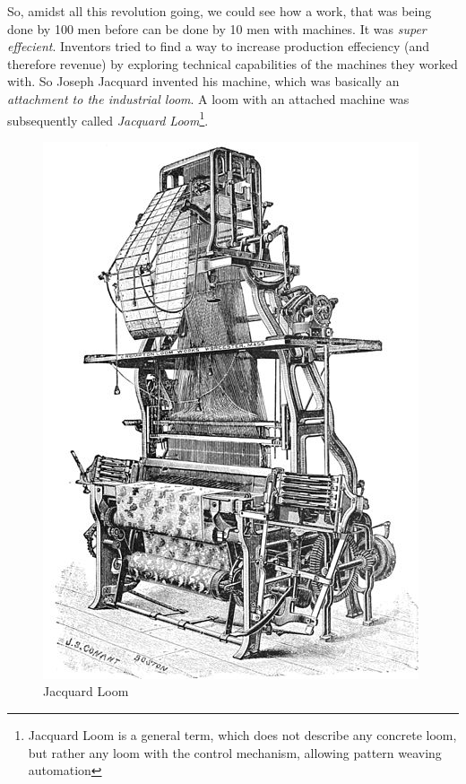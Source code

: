 \documentclass{article}
\begin{document}
            So, amidst all this revolution going, we could see how a work, that was being done by 100 men before can be done by 10 men with machines. It was \emph{super effecient}.
            Inventors tried to find a way to increase production effeciency (and therefore revenue) by exploring technical capabilities of the machines they worked with. So 
            Joseph Jacquard invented his machine, which was basically an \emph{attachment to the industrial loom}. A loom with an attached machine was subsequently called
            \emph{Jacquard Loom}\footnote{Jacquard Loom is a general term, which does not describe any concrete loom, but rather any loom with the control 
            mechanism, allowing pattern weaving automation}.

            \begin{figure}
                \centering
                \includegraphics[scale=0.2]{images/devices/device_jacquard_loom.jpg}
                \caption{Jacquard Loom}
            \end{figure}
\end{document}

